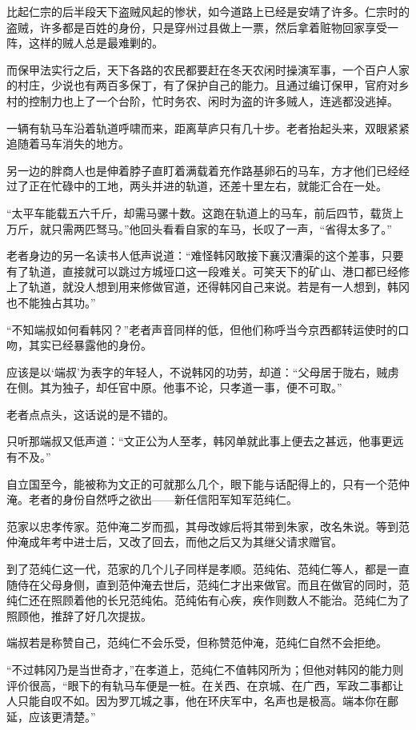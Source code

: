比起仁宗的后半段天下盗贼风起的惨状，如今道路上已经是安靖了许多。仁宗时的盗贼，许多都是百姓的身份，只是穿州过县做上一票，然后拿着赃物回家享受一阵，这样的贼人总是最难剿的。

而保甲法实行之后，天下各路的农民都要赶在冬天农闲时操演军事，一个百户人家的村庄，少说也有两百多保丁，有了保护自己的能力。且通过编订保甲，官府对乡村的控制力也上了一个台阶，忙时务农、闲时为盗的许多贼人，连逃都没逃掉。

一辆有轨马车沿着轨道呼啸而来，距离草庐只有几十步。老者抬起头来，双眼紧紧追随着马车消失的地方。

另一边的胖商人也是伸着脖子直盯着满载着充作路基卵石的马车，方才他们已经经过了正在忙碌中的工地，两头并进的轨道，还差十里左右，就能汇合在一处。

“太平车能载五六千斤，却需马骡十数。这跑在轨道上的马车，前后四节，载货上万斤，就只需两匹驽马。”他回头看看自家的车马，长叹了一声，“省得太多了。”

老者身边的另一名读书人低声说道：“难怪韩冈敢接下襄汉漕渠的这个差事，只要有了轨道，直接就可以跳过方城垭口这一段难关。可笑天下的矿山、港口都已经修上了轨道，就没人想到用来修做官道，还得韩冈自己来说。若是有一人想到，韩冈也不能独占其功。”

“不知端叔如何看韩冈？”老者声音同样的低，但他们称呼当今京西都转运使时的口吻，其实已经暴露他的身份。

应该是以‘端叔’为表字的年轻人，不说韩冈的功劳，却道：“父母居于陇右，贼虏在侧。其为独子，却任官中原。他事不论，只孝道一事，便不可取。”

老者点点头，这话说的是不错的。

只听那端叔又低声道：“文正公为人至孝，韩冈单就此事上便去之甚远，他事更远有不及。”

自立国至今，能被称为文正的可就那么几个，眼下能与话配得上的，只有一个范仲淹。老者的身份自然呼之欲出——新任信阳军知军范纯仁。

范家以忠孝传家。范仲淹二岁而孤，其母改嫁后将其带到朱家，改名朱说。等到范仲淹成年考中进士后，又改了回去，而他之后又为其继父请求赠官。

到了范纯仁这一代，范家的几个儿子同样是孝顺。范纯佑、范纯仁等人，都是一直随侍在父母身侧，直到范仲淹去世后，范纯仁才出来做官。而且在做官的同时，范纯仁还在照顾着他的长兄范纯佑。范纯佑有心疾，疾作则数人不能治。范纯仁为了照顾他，推辞了好几次提拔。

端叔若是称赞自己，范纯仁不会乐受，但称赞范仲淹，范纯仁自然不会拒绝。

“不过韩冈乃是当世奇才，”在孝道上，范纯仁不值韩冈所为；但他对韩冈的能力则评价很高，“眼下的有轨马车便是一桩。在关西、在京城、在广西，军政二事都让人只能自叹不如。因为罗兀城之事，他在环庆军中，名声也是极高。端本你在鄜延，应该更清楚。”

